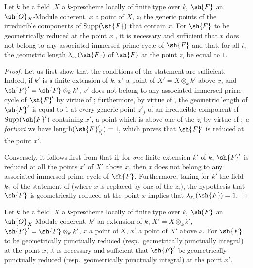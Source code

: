 
\begin{proposition}[4.7.10]
\label{IV.4.7.10}
Let $k$ be a field, $X$ a $k$-prescheme locally of finite type over $k$, $\sh{F}$ an $\sh{O}_X$-Module coherent, $x$ a point of $X$, $z_i$ the generic points of the irreducible components of $\operatorname{Supp}(\sh{F})$ that contain $x$.
For $\sh{F}$ to be geometrically reduced at the point $x$ , it is necessary and sufficient that $x$ does not belong to any associated immersed prime cycle of $\sh{F}$ and that, for all $i$, the geometric length $\lambda_{z_i}(\sh{F})$ of $\sh{F}$ at the point $z_i$ be equal to $1$.
\end{proposition}

\begin{proof}
Let us first show that the conditions of the statement are sufficient.
Indeed, if $k'$ is a finite extension of $k$, $x'$ a point of $X'=X\otimes_k k'$ above $x$, and $\sh{F}'=\sh{F}\otimes_k k'$, $x'$ does not belong to any associated immersed prime cycle of $\sh{F}'$ by virtue of ; furthermore, by virtue of , the geometric length of $\sh{F}'$ is equal to $1$ at every generic point $z'_j$ of an irreducible component of $\operatorname{Supp}(\sh{F}')$ containing $x'$, a point which is above one of the $z_i$ by virtue of ; \emph{a fortiori} we have $\operatorname{length}(\sh{F}'_{z'_j})=1$, which proves that $\sh{F}'$ is reduced at the point $x'$.

Conversely, it follows first from  that if, for \emph{one} finite extension $k'$ of $k$, $\sh{F}'$ is reduced at all the points $x'$ of $X'$ above $x$, then $x$ does not belong to any associated immersed prime cycle of $\sh{F}$.
Furthermore, taking for $k'$ the field $k_1$ of the statement of  (where $x$ is replaced by one of the $z_i$), the hypothesis that $\sh{F}$ is geometrically reduced at the point $x$ implies that $\lambda_{z_i}(\sh{F})=1$.
\end{proof}

\begin{proposition}[4.7.11]
\label{IV.4.7.11}
Let $k$ be a field, $X$ a $k$-prescheme locally of finite type over $k$, $\sh{F}$ an $\sh{O}_X$-Module coherent, $k'$ an extension of $k$, $X'=X\otimes_k k'$, $\sh{F}'=\sh{F}\otimes_k k'$, $x$ a point of $X$, $x'$ a point of $X'$ above $x$.
For $\sh{F}$ to be geometrically punctually reduced (resp.\ geometrically punctually integral) at the point $x$, it is necessary and sufficient that $\sh{F}'$ be geometrically punctually reduced (resp.\ geometrically punctually integral) at the point $x'$.
\end{proposition}

